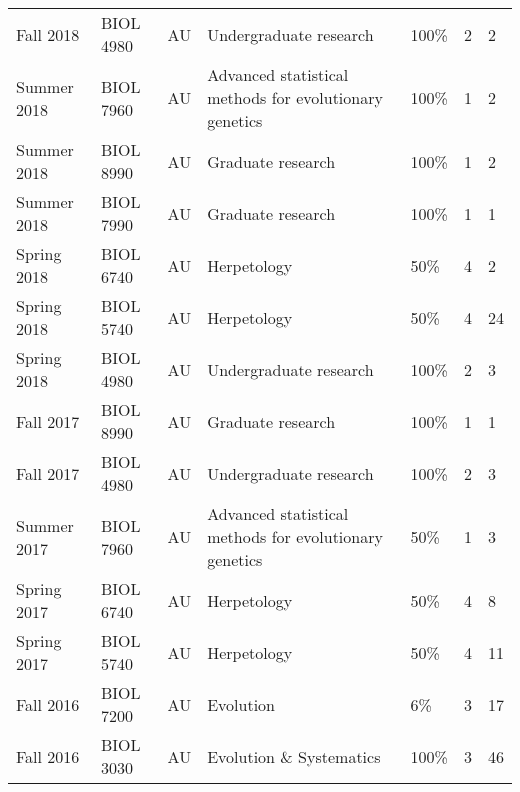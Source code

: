 {\begin{longtable}[l]{ p{0.7in} p{0.7in} p{0.7in} p{1.5in} p{0.7in} p{0.4in} p{0.8in} }
    Fall 2018 & BIOL 4980 & AU & Undergraduate research & 100\% & 2 & 2 \\ 
    Summer 2018 & BIOL 7960 & AU & Advanced statistical methods for evolutionary genetics & 100\% & 1 & 2 \\
    Summer 2018 & BIOL 8990 & AU & Graduate research & 100\% & 1 & 2 \\ 
    Summer 2018 & BIOL 7990 & AU & Graduate research & 100\% & 1 & 1 \\ 
    Spring 2018 & BIOL 6740 & AU & Herpetology & 50\% & 4 & 2 \\
    Spring 2018 & BIOL 5740 & AU & Herpetology & 50\% & 4 & 24 \\
    Spring 2018 & BIOL 4980 & AU & Undergraduate research & 100\% & 2 & 3 \\ 
    Fall 2017 & BIOL 8990 & AU & Graduate research & 100\% & 1 & 1 \\ 
    Fall 2017 & BIOL 4980 & AU & Undergraduate research & 100\% & 2 & 3 \\ 
    Summer 2017 & BIOL 7960 & AU & Advanced statistical methods for evolutionary genetics & 50\% & 1 & 3 \\
    Spring 2017 & BIOL 6740 & AU & Herpetology & 50\% & 4 & 8 \\
    Spring 2017 & BIOL 5740 & AU & Herpetology & 50\% & 4 & 11 \\
    Fall 2016 & BIOL 7200 & AU & Evolution & 6\% & 3 & 17 \\
    Fall 2016 & BIOL 3030 & AU & Evolution \& Systematics & 100\% & 3 & 46 \\
\end{longtable}
}

